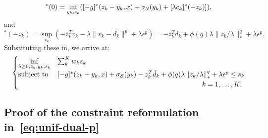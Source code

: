 \documentclass[12pt]{article}
\theoremstyle{thmstyleone}%
\theoremstyle{thmstyletwo}%
\theoremstyle{thmstylethree}%
\begin{document}
\begin{appendices}
\begin{equation*}
	[-g + \chi_{\supp} + \lambda c_k]^* (0) = \underset{y_{k},z_{k}}{\inf} ([-g]^*(z_{k} - y_{k},x) + \sigma_{\supp}(y_{k}) + [\lambda c_k]^* (-z_{k})]),
\end{equation*}
and
\begin{equation*}
	[\lambda c_k]^* (-z_{k}) = \underset{v_k}{\sup}(-z_{k}^T v_k - \lambda \| v_k - \bar{d}_k\|^p + \lambda \epsilon^p) =-z_{k}^T\bar{d}_k + \phi(q)\lambda {\|}z_{k}/\lambda{\|}^q_* + \lambda \epsilon^p.
\end{equation*}
Substituting these in, we arrive at:
\begin{equation*}
	\begin{aligned}
\begin{cases}
	\underset{\lambda \geq 0, z_{k},y_{k}, s_k}{\inf} & \sum_k^K w_k s_k\\
	\mbox{subject to} & [-g]^*(z_{k} - y_{k},x) + \sigma_{\supp}(y_{k}) - z_{k}^T\bar{d}_k  + \phi(q)\lambda \left\|z_{k}/\lambda \right\|^q_* + \lambda \epsilon^p \le s_k \\
	& \hspace{7cm} \quad k = 1,\dots,K.
\end{cases}
\end{aligned}
\end{equation*}
\ifpreprint
\subsection{Proof of the constraint reformulation in~\eqref{eq:unif-dual-p}}
\else

\end{appendices}
\end{document}
